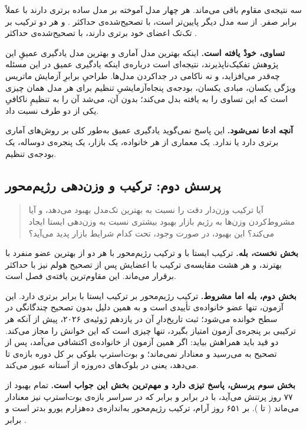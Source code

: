 سه نتیجه‌ی مقاوم باقی می‌ماند. هر چهار مدل آموخته بر مدل ساده برتری دارند با
 عملاً برابر صفر.  از سه مدل دیگر پایین‌تر است، با 
تصحیح‌شده‌ی حداکثر . و هر دو ترکیب بر تک‌تک اعضای خود برتری دارند،
با  تصحیح‌شده‌ی حداکثر .

\textbf{تساوی، خودْ یافته است.} اینکه بهترین مدل آماری و بهترین مدل یادگیری
عمیقِ این پژوهش تفکیک‌ناپذیرند، نتیجه‌ای است درباره‌ی اینکه یادگیری عمیق در این
مسئله چه‌قدر می‌افزاید، و نه ناکامی در جداکردن مدل‌ها. طراحیِ برابرِ آزمایش
 ماتریس ویژگی یکسان، مبادی یکسان، بودجه‌ی پنجاه‌آزمایشیِ تنظیم برای هر
مدل  همان چیزی است که این تساوی را به یافته بدل می‌کند؛ بدون آن،
می‌شد آن را به تنظیمِ ناکافیِ یکی از دو طرف نسبت داد.

\textbf{آنچه ادعا نمی‌شود.} این پاسخ نمی‌گوید یادگیری عمیق به‌طور کلی بر
روش‌های آماری برتری دارد یا ندارد. یک معماری از هر خانواده، یک بازار، یک
پنجره‌ی دوساله، یک بودجه‌ی تنظیم.

\subsection*{پرسش دوم: ترکیب و وزن‌دهی رژیم‌محور}

\begin{quote}
آیا ترکیب وزن‌دار دقت را نسبت به بهترین تک‌مدل بهبود می‌دهد، و آیا
مشروط‌کردن وزن‌ها به رژیم بازار بهبود بیشتری نسبت به وزن‌دهی ایستا ایجاد
می‌کند؟ این بهبود، در صورت وجود، تحت کدام شرایط بازار پدید می‌آید؟
\end{quote}

\textbf{بخش نخست، بله.} ترکیب ایستا با  و ترکیب رژیم‌محور با
 هر دو از بهترین عضو منفرد   با  
بهترند، و هر هشت مقایسه‌ی ترکیب با اعضایش پس از تصحیح هولم نیز با 
حداکثر  برقرار می‌ماند. این مقاوم‌ترین یافته‌ی فصل است.

\textbf{بخش دوم، بله اما مشروط.} ترکیب رژیم‌محور بر ترکیب ایستا با 
برابر  برتری دارد. این آزمون، تنها عضو خانواده‌ی تأییدی است و به
همین دلیل بدون تصحیح چندگانگی در سطح  خوانده می‌شود؛ ثبت تاریخ‌دارِ آن
در یازدهم ژوئیه‌ی ۲۰۲۶، پیش از آنکه هر ترکیبی بر پنجره‌ی آزمون امتیاز بگیرد، تنها
چیزی است که این خوانش را مجاز می‌کند. دو قید باید همراهش بیاید: اگر همین آزمون
از خانواده‌ی اکتشافی می‌آمد، پس از تصحیح به  می‌رسید و معنادار
نمی‌ماند؛ و بوت‌استرپ بلوکی بر کل دوره بازه‌ی  تا  می‌دهد،
یعنی در بلوک‌های ده‌روزه از آستانه عبور می‌کند.

\textbf{بخش سوم پرسش، پاسخ تیزی دارد و مهم‌ترین بخش این جواب است.} تمام بهبود
از ۷۷ روز پرتنش می‌آید، با  در برابر  و  برابر
  که در سراسر بازه‌ی بوت‌استرپ نیز معنادار می‌ماند
( تا ). بر ۶۵۱ روز آرام، ترکیب رژیم‌محور به‌اندازه‌ی
ده‌هزارم یورو بدتر است و  برابر .

